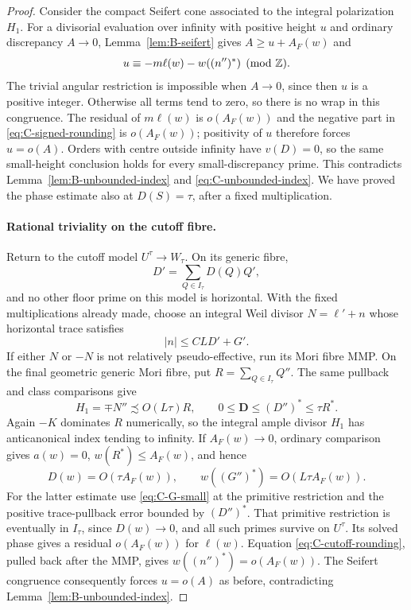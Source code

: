 \begin{proof}
Consider the compact Seifert cone associated to the integral
polarization $H_1$.  For a divisorial evaluation over infinity with
positive height $u$ and ordinary discrepancy $A\to0$,
Lemma~\ref{lem:B-seifert} gives $A\geq u+A_F(w)$ and
\[
                    u\equiv-m\ell(w)-w((n'')^*)\pmod{\mathbb Z}.
\]
The trivial angular restriction is impossible when $A\to0$, since
then $u$ is a positive integer.  Otherwise all terms tend to zero,
so there is no wrap in this congruence.  The residual of $m\ell(w)$
is $o(A_F(w))$ and the negative part in
\eqref{eq:C-signed-rounding} is $o(A_F(w))$; positivity of $u$
therefore forces $u=o(A)$.  Orders with centre outside infinity have $v(D)=0$, so the same
small-height conclusion holds for every small-discrepancy prime.
This contradicts Lemma~\ref{lem:B-unbounded-index} and
\eqref{eq:C-unbounded-index}.  We have proved the phase estimate also
at $D(S)=\tau$, after a fixed multiplication.

\paragraph{Rational triviality on the cutoff fibre.}
Return to the cutoff model $U^\tau\to W_\tau$.  On its generic
fibre,
\[
                   D'=\sum_{Q\in I_\tau}D(Q)Q',
\]
and no other floor prime on this model is horizontal.  With the fixed
multiplications already made, choose an integral Weil divisor
$N=\ell'+n$ whose horizontal trace satisfies
\begin{equation}\label{eq:C-cutoff-rounding}
                         |n|\leq CLD'+G'.
\end{equation}
If either $N$ or $-N$ is not relatively pseudo-effective, run its Mori
fibre MMP.  On the final geometric generic Mori fibre, put
$R=\sum_{Q\in I_\tau}Q''$.  The same pullback and class comparisons
give
\begin{equation}\label{eq:C-second-large-index}
 H_1=\mp N''\precsim O(L\tau)R,\qquad
          0\leq\mathbf D\leq(D'')^*\leq\tau R^*.
\end{equation}
Again $-K$ dominates $R$ numerically, so the integral ample divisor
$H_1$ has anticanonical index tending to infinity.  If $A_F(w)\to0$,
ordinary comparison gives $a(w)=0$, $w(R^*)\leq A_F(w)$, and hence
\[
 D(w)=O(\tau A_F(w)),\qquad
                  w((G'')^*)=O(L\tau A_F(w)).
\]
For the latter estimate use \eqref{eq:C-G-small} at the primitive
restriction and the positive trace-pullback error bounded by
$(D'')^*$.  That primitive restriction is eventually in $I_\tau$,
since $D(w)\to0$, and all such primes survive on $U^\tau$.
Its solved phase gives a residual $o(A_F(w))$ for $\ell(w)$.
Equation \eqref{eq:C-cutoff-rounding}, pulled back after the MMP,
gives $w((n'')^*)=o(A_F(w))$.  The Seifert congruence consequently
forces $u=o(A)$ as before, contradicting
Lemma~\ref{lem:B-unbounded-index}.


\end{proof}
